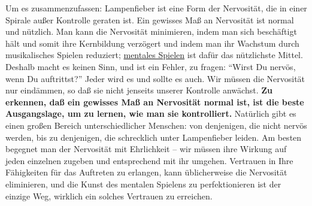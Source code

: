 Um es zusammenzufassen: Lampenfieber ist eine Form der Nervosität, die in einer Spirale außer Kontrolle geraten ist.
Ein gewisses Maß an Nervosität ist normal und nützlich.
Man kann die Nervosität minimieren, indem man sich beschäftigt hält und somit ihre Kernbildung verzögert und indem man ihr Wachstum durch musikalisches Spielen reduziert; \hyperref[c1ii12mental]{mentales Spielen} ist dafür das nützlichste Mittel.
Deshalb macht es keinen Sinn, und ist ein Fehler, zu fragen: \enquote{Wirst Du nervös, wenn Du auftrittst?}
Jeder wird es und sollte es auch.
Wir müssen die Nervosität nur eindämmen, so daß sie nicht jenseits unserer Kontrolle anwächst.
\textbf{Zu erkennen, daß ein gewisses Maß an Nervosität normal ist, ist die beste Ausgangslage, um zu lernen, wie man sie kontrolliert.}
Natürlich gibt es einen großen Bereich unterschiedlicher Menschen: von denjenigen, die nicht nervös werden, bis zu denjenigen, die schrecklich unter Lampenfieber leiden.
Am besten begegnet man der Nervosität mit Ehrlichkeit -- wir müssen ihre Wirkung auf jeden einzelnen zugeben und entsprechend mit ihr umgehen.
Vertrauen in Ihre Fähigkeiten für das Auftreten zu erlangen, kann üblicherweise die Nervosität eliminieren, und die Kunst des mentalen Spielens zu perfektionieren ist der einzige Weg, wirklich ein solches Vertrauen zu erreichen.



